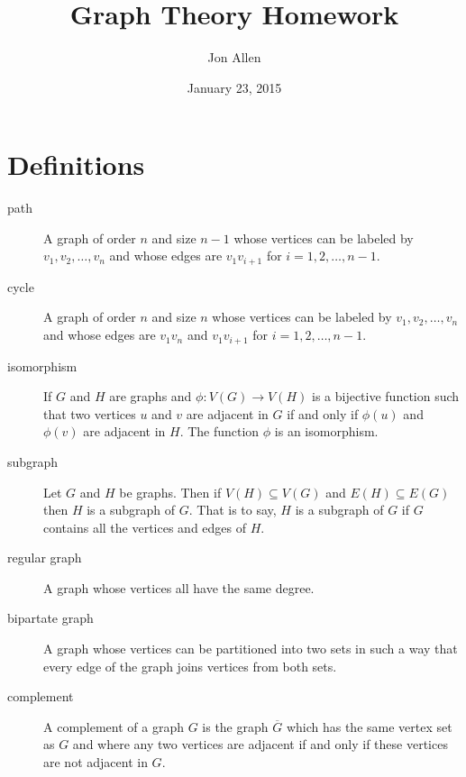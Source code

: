 \documentclass[letterpaper]{article}
\begin{document}
\title{Graph Theory Homework}
\date{January 23, 2015}
\author{Jon Allen}
\maketitle
\renewcommand{\labelenumi}{1.\arabic{enumi}}
\renewcommand{\labelenumii}{\arabic{enumii}.}
\renewcommand{\labelenumiii}{(\alph{enumiii})}
\section*{Definitions}
\begin{description}
\item[path]
A graph of order $n$ and size $n-1$ whose vertices can be labeled by $v_1,v_2,\dots,v_n$ and whose edges are $v_1v_{i+1}$ for $i=1,2,\dots,n-1$.
\item[cycle]
A graph of order $n$ and size $n$ whose vertices can be labeled by $v_1,v_2,\dots,v_n$ and whose edges are $v_1v_n$ and $v_1v_{i+1}$ for $i=1,2,\dots,n-1$.
\item[isomorphism]
If $G$ and $H$ are graphs and $\phi:V(G)\to V(H)$ is a bijective function such that two vertices $u$ and $v$ are adjacent in $G$ if and only if $\phi(u)$ and $\phi(v)$ are adjacent in $H$. The function $\phi$ is an isomorphism.
\item[subgraph]
Let $G$ and $H$ be graphs. Then if $V(H)\subseteq V(G)$ and $E(H)\subseteq E(G)$ then $H$ is a subgraph of $G$. That is to say, $H$ is a subgraph of $G$ if $G$ contains all the vertices and edges of $H$.
\item[regular graph]
A graph whose vertices all have the same degree.
\item[bipartate graph]
A graph whose vertices can be partitioned into two sets in such a way that every edge of the graph joins vertices from both sets.
\item[complement]
A complement of a graph $G$ is the graph $\overline{G}$ which has the same vertex set as $G$ and where any two vertices are adjacent if and only if these vertices are not adjacent in $G$.
\end{description}
\end{document}
